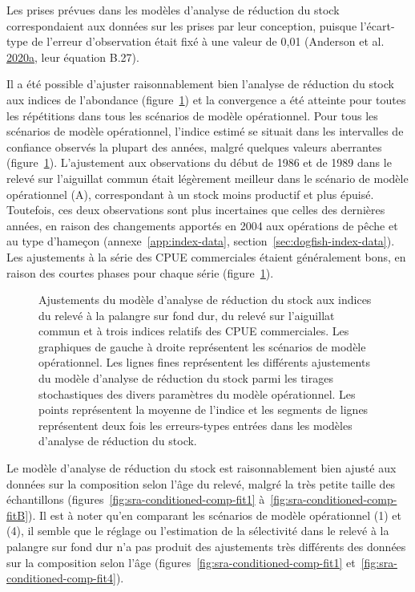\documentclass[11pt]{book}
\begin{document}
Les prises prévues dans les modèles d'analyse de réduction du stock correspondaient aux données sur les prises par leur conception, puisque l'écart-type de l'erreur d'observation était fixé à une valeur de 0,01 (Anderson et al. \protect\hyperlink{ref-anderson2020gfmp}{2020}\protect\hyperlink{ref-anderson2020gfmp}{a}, leur équation B.27).

Il a été possible d'ajuster raisonnablement bien l'analyse de réduction du stock aux indices de l'abondance (figure~\ref{fig:survey-fits}) et la convergence a été atteinte pour toutes les répétitions dans tous les scénarios de modèle opérationnel. Pour tous les scénarios de modèle opérationnel, l'indice estimé se situait dans les intervalles de confiance observés la plupart des années, malgré quelques valeurs aberrantes (figure~\ref{fig:survey-fits}). L'ajustement aux observations du début de 1986 et de 1989 dans le relevé sur l'aiguillat commun était légèrement meilleur dans le scénario de modèle opérationnel (A), correspondant à un stock moins productif et plus épuisé. Toutefois, ces deux observations sont plus incertaines que celles des dernières années, en raison des changements apportés en 2004 aux opérations de pêche et au type d'hameçon (annexe~\ref{app:index-data}, section~\ref{sec:dogfish-index-data}). Les ajustements à la série des CPUE commerciales étaient généralement bons, en raison des courtes phases pour chaque série (figure~\ref{fig:survey-fits}).


\begin{figure}[htb]

{\centering {} 

}

\caption{Ajustements du modèle d'analyse de réduction du stock aux indices du relevé à la palangre sur fond dur, du relevé sur l'aiguillat commun et à trois indices relatifs des CPUE commerciales. Les graphiques de gauche à droite représentent les scénarios de modèle opérationnel. Les lignes fines représentent les différents ajustements du modèle d'analyse de réduction du stock parmi les tirages stochastiques des divers paramètres du modèle opérationnel. Les points représentent la moyenne de l'indice et les segments de lignes représentent deux fois les erreurs-types entrées dans les modèles d'analyse de réduction du stock.}\label{fig:survey-fits}
\end{figure}
Le modèle d'analyse de réduction du stock est raisonnablement bien ajusté aux données sur la composition selon l'âge du relevé, malgré la très petite taille des échantillons (figures~\ref{fig:sra-conditioned-comp-fit1} à~\ref{fig:sra-conditioned-comp-fitB}). Il est à noter qu'en comparant les scénarios de modèle opérationnel (1) et (4), il semble que le réglage ou l'estimation de la sélectivité dans le relevé à la palangre sur fond dur n'a pas produit des ajustements très différents des données sur la composition selon l'âge (figures~\ref{fig:sra-conditioned-comp-fit1} et~\ref{fig:sra-conditioned-comp-fit4}).
\end{document}
